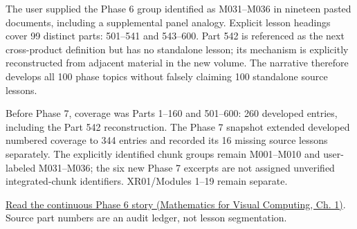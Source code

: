 The user supplied the Phase 6 group identified as M031--M036 in nineteen pasted documents, including a supplemental panel analogy. Explicit lesson headings cover 99 distinct parts: 501--541 and 543--600. Part 542 is referenced as the next cross-product definition but has no standalone lesson; its mechanism is explicitly reconstructed from adjacent material in the new volume. The narrative therefore develops all 100 phase topics without falsely claiming 100 standalone source lessons.

Before Phase 7, coverage was Parts 1--160 and 501--600: 260 developed entries, including the Part 542 reconstruction. The Phase 7 snapshot extended developed numbered coverage to 344 entries and recorded its 16 missing source lessons separately. The explicitly identified chunk groups remain M001--M010 and user-labeled M031--M036; the six new Phase 7 excerpts are not assigned unverified integrated-chunk identifiers. XR01/Modules 1--19 remain separate.

\href{../02-Mathematics-for-Visual-Computing/main.pdf\#nameddest=01-foundations-i-ch017-the-panel-gives-us-a-reason-to-learn}{Read the continuous Phase 6 story (Mathematics for Visual Computing, Ch. 1)}. Source part numbers are an audit ledger, not lesson segmentation.

